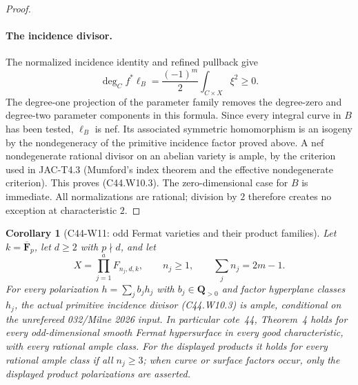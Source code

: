 \documentclass[11pt]{article}
\newtheorem{corollary}[theorem]{Corollary}
\theoremstyle{remark}\newtheorem{remark}[theorem]{Remark}
\begin{document}
\begin{proof}
\paragraph{The incidence divisor.}
The normalized incidence identity and refined pullback give
\[
                  \deg_C f^*\ell_B
                         =\frac{(-1)^m}{2}
                                       \int_{C\times X}\xi^2\geq0.
 \tag{C44.W10.9}
\]
The degree-one projection of the parameter family removes the
degree-zero and degree-two parameter components in this formula.
Since every integral curve in $B$ has been tested, $\ell_B$ is nef.
Its associated symmetric homomorphism is an isogeny by the
nondegeneracy of the primitive incidence factor proved above.
A nef nondegenerate rational divisor on an abelian variety is ample,
by the criterion used in JAC-T4.3 (Mumford's index theorem and the
effective nondegenerate criterion). This proves (C44.W10.3).
The zero-dimensional case for $B$ is immediate. All normalizations
are rational; division by $2$ therefore creates no exception at
characteristic $2$.
\end{proof}

\begin{corollary}[C44-W11: odd Fermat varieties and their product families]
Let $k=\overline{\mathbf F}_p$, let $d\geq2$ with $p\nmid d$, and let
\[
             X=\prod_{j=1}^{a}F_{n_j,d,k},\qquad
             n_j\geq1,\qquad \sum_jn_j=2m-1.
\]
For every polarization $h=\sum_j b_jh_j$ with $b_j\in\mathbf Q_{>0}$
and factor hyperplane classes $h_j$, the actual primitive incidence
divisor (C44.W10.3) is ample, conditional on the unrefereed
032/Milne 2026 input. In particular cote~44, Theorem~4 holds for
every odd-dimensional smooth Fermat hypersurface in every good
characteristic, with every rational ample class. For the displayed
products it holds for every rational ample class if all $n_j\geq3$;
when curve or surface factors occur, only the displayed product
polarizations are asserted.
\end{corollary}
\end{document}
